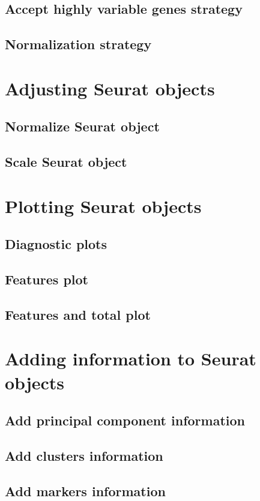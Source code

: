 \subsection{Accept highly variable genes strategy}
\subsection{Normalization strategy}

\section{Adjusting Seurat objects}
\subsection{Normalize Seurat object}
\subsection{Scale Seurat object}

\section{Plotting Seurat objects}
\subsection{Diagnostic plots}
\subsection{Features plot}
\subsection{Features and total plot}

\section{Adding information to Seurat objects}
\subsection{Add principal component information}
\subsection{Add clusters information}
\subsection{Add markers information}

